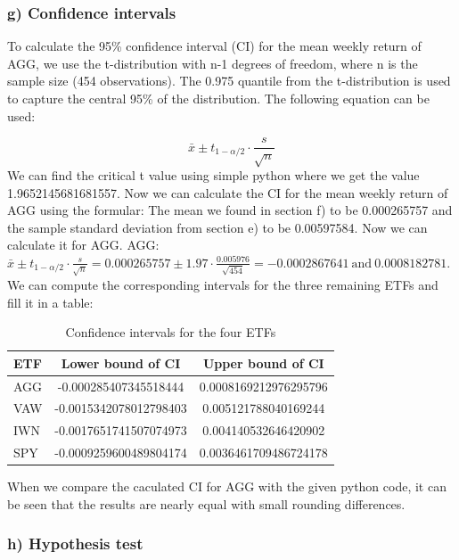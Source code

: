 \documentclass{rapport}
\begin{document}
\noindent


\subsubsection*{\textbf{g)} Confidence intervals}
\noindent
To calculate the 95\% confidence interval (CI) for the mean weekly return of AGG, we use the t-distribution with 
n-1 degrees of freedom, where n is the sample size (454 observations). 
The 0.975 quantile from the t-distribution is used to capture the central 95\% of the distribution.
The following equation can be used:

\[
\bar{x} \pm t_{1-\alpha/2} \cdot \frac{s}{\sqrt{n}}
\]
\noindent
We can find the critical t value using simple python where we get the value 1.9652145681681557. 
Now we can calculate the CI for the mean weekly return of AGG using the formular:
The mean we found in section f) to be 0.000265757 and the sample standard deviation from section e) to be 0.00597584. Now we can calculate it for AGG.
AGG: $\bar{x} \pm t_{1-\alpha/2} \cdot \frac{s}{\sqrt{n}} = 0.000265757 \pm 1.97 \cdot \frac{0.005976}{\sqrt{454}} = -0.0002867641 \ \text{and} \ 0.0008182781$.
\noindent
We can compute the corresponding intervals for the three remaining ETFs and fill it in a table:

\begin{table}[H]
    \centering
    \begin{tabular}{|l|c|c|}
    \hline
    \textbf{ETF} & \textbf{Lower bound of CI} & \textbf{Upper bound of CI} \\ \hline
    AGG  & -0.000285407345518444 & 0.0008169212976295796 \\ \hline
    VAW  & -0.0015342078012798403 & 0.005121788040169244 \\ \hline
    IWN  & -0.0017651741507074973 & 0.004140532646420902 \\ \hline
    SPY  & -0.0009259600489804174 & 0.0036461709486724178 \\ \hline
    \end{tabular}
    \caption{Confidence intervals for the four ETFs}
\end{table}
\noindent
When we compare the caculated CI for AGG with the given python code, it can be seen that the results are nearly equal with small rounding differences. 

\subsubsection*{\textbf{h)} Hypothesis test}
\end{document}
